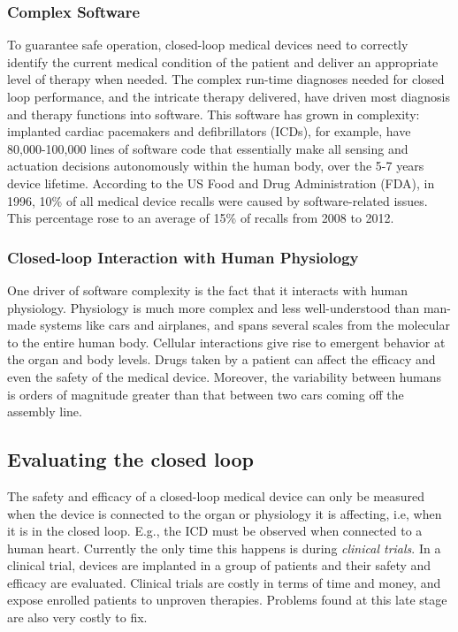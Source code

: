 \subsubsection{Complex Software}
To guarantee safe operation, closed-loop medical devices need to correctly identify the current medical condition of the patient and deliver an appropriate level of therapy when needed.
The complex run-time diagnoses needed for closed loop performance, and the intricate therapy delivered, have driven most diagnosis and therapy functions into software.
This software has grown in complexity: 
implanted cardiac pacemakers and defibrillators (ICDs), for example, have 80,000-100,000 lines of software code that essentially make all sensing and actuation decisions autonomously within the human body, over the 5-7 years device lifetime. 
According to the US Food and Drug Administration (FDA), in 1996, 10\% of all medical device recalls were caused by software-related issues. 
This percentage rose to an average of 15\% of recalls from 2008 to 2012. 
 
\subsubsection{Closed-loop Interaction with Human Physiology}
One driver of software complexity is the fact that it interacts with human physiology. 
Physiology is much more complex and less well-understood than man-made systems like cars and airplanes, and spans several scales from the molecular to the entire human body.
Cellular interactions give rise to emergent behavior at the organ and body levels.
Drugs taken by a patient can affect the efficacy and even the safety of the medical device.
Moreover, the variability between humans is orders of magnitude greater than that between two cars coming off the assembly line.

\subsection{Evaluating the closed loop}
The safety and efficacy of a closed-loop medical device can only be measured when the device is connected to the organ or physiology it is affecting, i.e, when it is in the closed loop. 
E.g., the ICD must be observed when connected to a human heart.
Currently the only time this happens is during \emph{clinical trials}.
In a clinical trial, devices are implanted in a group of patients and their safety and efficacy are evaluated.
Clinical trials are costly in terms of time and money, and expose enrolled patients to unproven therapies.
Problems found at this late stage are also very costly to fix.

